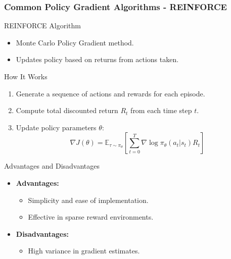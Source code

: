 \documentclass[aspectratio=169]{beamer}
\begin{document}
\begin{frame}[fragile]
    \frametitle{Common Policy Gradient Algorithms - REINFORCE}
    \begin{block}{REINFORCE Algorithm}
        \begin{itemize}
            \item Monte Carlo Policy Gradient method.
            \item Updates policy based on returns from actions taken.
        \end{itemize}
    \end{block}
    
    \begin{block}{How It Works}
        \begin{enumerate}
            \item Generate a sequence of actions and rewards for each episode.
            \item Compute total discounted return \( R_t \) from each time step \( t \).
            \item Update policy parameters \( \theta \):
            \begin{equation}
                \nabla J(\theta) = \mathbb{E}_{\tau \sim \pi_\theta} \left[ \sum_{t=0}^T \nabla \log \pi_\theta(a_t | s_t) R_t \right]
            \end{equation}
        \end{enumerate}
    \end{block}

    \begin{block}{Advantages and Disadvantages}
        \begin{itemize}
            \item \textbf{Advantages:}
                \begin{itemize}
                    \item Simplicity and ease of implementation.
                    \item Effective in sparse reward environments.
                \end{itemize}
            \item \textbf{Disadvantages:}
                \begin{itemize}
                    \item High variance in gradient estimates.
                \end{itemize}
        \end{itemize}
    \end{block}
\end{frame}
\end{document}
